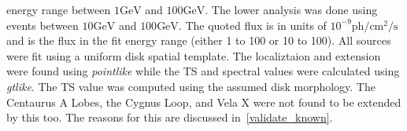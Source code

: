 \documentclass[preprint]{aastex}
\newcommand{\gev}{\text{GeV}\xspace}
\newcommand{\s}{\text{s}\xspace}
\newcommand{\ph}{\text{ph}\xspace}
\newcommand{\cm}{\text{cm}\xspace}
\newcommand{\pointlike}{{\em pointlike}\xspace}
\newcommand{\gtlike}{{\em gtlike}\xspace}
\begin{document}
\begin{table}
\begin{centering}
{      energy range between $1\gev$ and $100\gev$.  The lower analysis
      was done using events between $10\gev$ and $100\gev$.  The quoted
      flux is in units of $10^{-9}\ph/\cm^2/\s$ and is the flux in the
      fit energy range (either 1\gev to 100\gev or 10\gev to 100\gev).
      All sources were fit using a uniform disk spatial template. The
      localiztaion and extension were found using \pointlike while the TS
      and spectral values were calculated using \gtlike.  The TS value was
      computed using the assumed disk morphology. The Centaurus A Lobes,
      the Cygnus Loop, and Vela X were not found to be extended by this
      too. The reasons for this are discussed in~\ref{validate_known}.
      }
    \end{centering}
\end{table}


\clearpage
\end{document}
